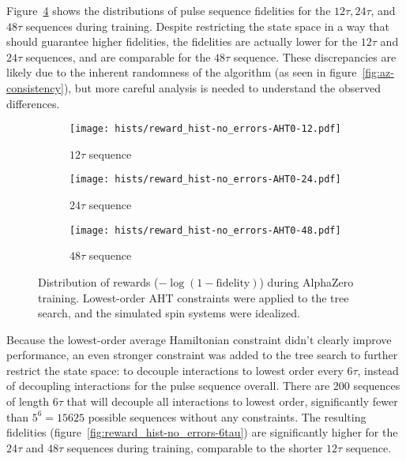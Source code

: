 Figure~\ref{fig:reward_hist-no_errors-AHT0} shows the distributions of pulse sequence fidelities for the $12\tau, 24\tau$, and $48\tau$ sequences during training. Despite restricting the state space in a way that should guarantee higher fidelities, the fidelities are actually lower for the $12\tau$ and $24\tau$ sequences, and are comparable for the $48\tau$ sequence. These discrepancies are likely due to the inherent randomness of the algorithm (as seen in figure~\ref{fig:az-consistency}), but more careful analysis is needed to understand the observed differences.

\begin{figure}[H]
    \centering
    \begin{subfigure}{.49\textwidth}
        \centering
        \texttt{[image: hists/reward\_hist-no\_errors-AHT0-12.pdf]}
        \caption{$12\tau$ sequence}
        \label{fig:reward_hist-no_errors-AHT0-12}
    \end{subfigure}
    \begin{subfigure}{.49\textwidth}
        \centering
        \texttt{[image: hists/reward\_hist-no\_errors-AHT0-24.pdf]}
        \caption{$24\tau$ sequence}
        \label{fig:reward_hist-no_errors-AHT0-24}
    \end{subfigure}
    \begin{subfigure}{.49\textwidth}
        \centering
        \texttt{[image: hists/reward\_hist-no\_errors-AHT0-48.pdf]}
        \caption{$48\tau$ sequence}
        \label{fig:reward_hist-no_errors-AHT0-48}
    \end{subfigure}
    \caption{Distribution of rewards ($-\log(1 - \text{fidelity})$) during AlphaZero training. Lowest-order AHT constraints were applied to the tree search, and the simulated spin systems were idealized.}
    \label{fig:reward_hist-no_errors-AHT0}
\end{figure}


Because the lowest-order average Hamiltonian constraint didn't clearly improve performance, an even stronger constraint was added to the tree search to further restrict the state space: to decouple interactions to lowest order every $6\tau$, instead of decoupling interactions for the pulse sequence overall.
There are 200 sequences of length $6\tau$ that will decouple all interactions to lowest order, significantly fewer than $5^6 = 15625$ possible sequences without any constraints. The resulting fidelities (figure~\ref{fig:reward_hist-no_errors-6tau}) are significantly higher for the $24\tau$ and $48\tau$ sequences during training, comparable to the shorter $12\tau$ sequence.

